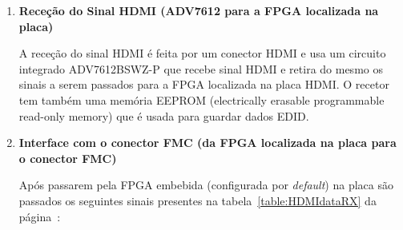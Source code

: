 \begin{enumerate}
	\item \textbf{Receção do Sinal HDMI (ADV7612 para a FPGA localizada na placa)}
	
	\hspace{1.0em}A receção do sinal HDMI é feita por um conector HDMI e usa um circuito integrado ADV7612BSWZ-P que recebe sinal HDMI e retira do mesmo os sinais a serem passados para a FPGA localizada na placa HDMI. O recetor tem também uma memória EEPROM (electrically erasable programmable read-only memory) que é usada para guardar dados EDID.
	\item \textbf{Interface com o conector FMC (da FPGA localizada na placa para o conector FMC)}
	
	\hspace{1.0em}Após passarem pela FPGA embebida (configurada por \textit{default}) na placa são passados os seguintes sinais presentes na tabela~\ref{table:HDMIdataRX} da página~\pageref{table:HDMIdataRX}:


\end{enumerate}
